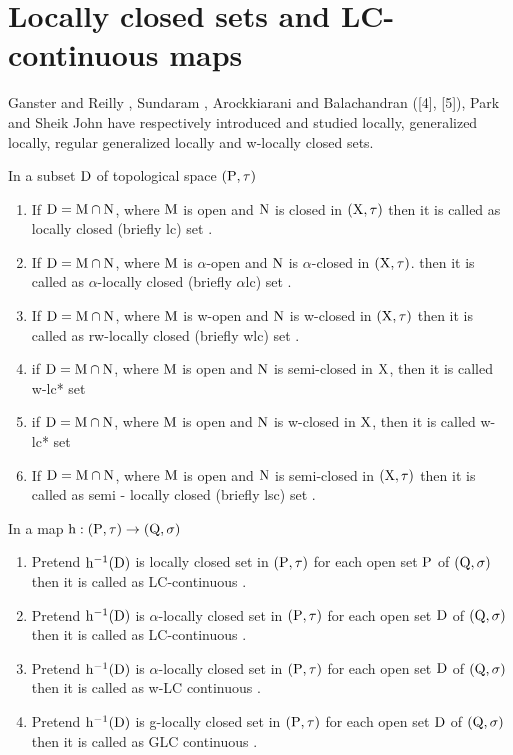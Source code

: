\section{Locally closed sets and LC-continuous maps}

Ganster and Reilly \cite{Ganster}, Sundaram \cite{Sundaram}, Arockkiarani \cite{Arockiarani} and Balachandran ([4], [5]), Park \cite{Park} and Sheik John \cite{Sheik1} have respectively introduced and studied locally, generalized locally, regular generalized locally and w-locally closed sets. 

\begin{dfn}\label{dfn1.5.1}
In a subset $\mathrm{D}$ of topological space $(\mathrm{P}, \tau)$ 
\begin{enumerate}[\rm (i)]
\item If $\mathrm{D}=\mathrm{M} \cap \mathrm{N}$, where $\mathrm{M}$ is open and $\mathrm{N}$ is closed in $(\mathrm{X},\tau)$ then it is called as locally closed (briefly lc) set \cite{Reilly1}. 
\item If $\mathrm{D}=\mathrm{M} \cap \mathrm{N}$, where $\mathrm{M}$ is $\alpha$-open and $\mathrm{N}$ is $\alpha$-closed in $(\mathrm{X}, \tau)$. then it is called as $\alpha$-locally closed (briefly $\alpha$lc) set \cite{Njastad}.
\item If $\mathrm{D}=\mathrm{M} \cap \mathrm{N}$, where $\mathrm{M}$ is w-open and $\mathrm{N}$ is w-closed in $(\mathrm{X}, \tau)$ then it is called as rw-locally closed (briefly wlc) set \cite{Sheik1}.
\item \cite{Sheik1} if $\mathrm{D}=\mathrm{M} \cap \mathrm{N}$, where $\mathrm{M}$ is open and $\mathrm{N}$ is semi-closed in $\mathrm{X}$, then it is called w-lc* set
\item \cite{Sheik1} if $\mathrm{D}=\mathrm{M} \cap \mathrm{N}$, where $\mathrm{M}$ is open and $\mathrm{N}$ is w-closed in $\mathrm{X}$, then it is called w-lc* set
\item If $\mathrm{D}=\mathrm{M}\cap \mathrm{N}$, where $\mathrm{M}$ is open and $\mathrm{N}$ is semi-closed in $(\mathrm{X}, \tau)$ then it is called as semi - locally closed (briefly lsc) set \cite{Balachandran}.
\end{enumerate}
\end{dfn}

\begin{dfn}\label{dfn1.5.2} 
In a map $\mathrm{h}: (\mathrm{P}, \tau) \rightarrow (\mathrm{Q}, \sigma)$ 
\begin{enumerate}[\rm (i)]
\item Pretend $\mathrm{h}^{-1}(\mathrm{D})$ is locally closed set in $(\mathrm{P}, \tau)$ for each open set $\mathrm{P}$ of $(\mathrm{Q}, \sigma)$ then it is called as LC-continuous \cite{Reilly1}.
\item Pretend $\mathrm{h}^{-1}(\mathrm{D})$ is $\alpha$-locally closed set in $(\mathrm{P}, \tau)$ for each open set $\mathrm{D}$ of $(\mathrm{Q}, \sigma)$ then it is called as LC-continuous \cite{Njastad}.
\item Pretend $\mathrm{h}^{-1}(\mathrm{D})$ is $\alpha$-locally closed set in $(\mathrm{P},\tau)$ for each open set $\mathrm{D}$ of $(\mathrm{Q}, \sigma)$ then it is called as w-LC continuous \cite{Sheik}.
\item Pretend $\mathrm{h}^{-1}(\mathrm{D})$ is g-locally closed set in $(\mathrm{P},\tau)$ for each open set $\mathrm{D}$ of $(\mathrm{Q}, \sigma)$ then it is called as GLC continuous \cite{Balachandran}.
\end{enumerate}
\end{dfn}

